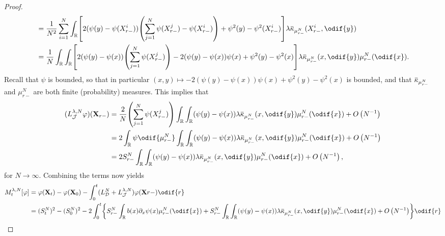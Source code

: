\begin{proof}
\begin{equation}
\begin{split}
       & = \frac{1}{N^2} \sum_{i=1}^N \int_\potspace \sbr*{ 2 (\psi(y) - \psi(X_{r-}^i)) \br*{\sum_{j=1}^N \psi(X_{r-}^j) - \psi(X_{r-}^i)} + \psi^2(y) - \psi^2(X_{r-}^i) } \lambda \ol{\kappa}_{\mu_{r-}^N}(X_{r-}^i, \odif{y})                               \\
       & = \frac{1}{N} \int_\potspace \int_\potspace \sbr*{ 2 (\psi(y) - \psi(x)) \br*{\sum_{j=1}^N \psi(X_{r-}^j)} - 2 (\psi(y) - \psi(x)) \psi(x) + \psi^2(y) - \psi^2(x) } \lambda \ol{\kappa}_{\mu_{r-}^N}(x, \odif{y}) \mu_{r-}^N(\odif{x}).
    \end{split}
  \end{equation}
  Recall that \( \psi \) is bounded, so that in particular \( (x,y) \mapsto - 2 (\psi(y) - \psi(x)) \psi(x) + \psi^2(y) - \psi^2(x) \) is bounded, and that \( \ol{\kappa}_{\mu_{r-}^N} \) and \( \mu_{r-}^N \) are both finite (probability) measures.
  This implies that
  \begin{equation}
    \begin{split}
      (L_{\cJ}^{\lambda, N} \varphi) (\bm{X}_{r-})
       & = \frac{2}{N} \br*{\sum_{j=1}^N \psi(X_{r-}^j)}  \int_\potspace \int_\potspace (\psi(y) - \psi(x)) \lambda \ol{\kappa}_{\mu_{r-}^N}(x, \odif{y}) \mu_{r-}^N(\odif{x}) + \bigO{N^{-1}} \\
       & = 2 \int_\potspace \psi \odif{\mu_{r-}^N} \int_\potspace \int_\potspace (\psi(y) - \psi(x)) \lambda \ol{\kappa}_{\mu_{r-}^N}(x, \odif{y}) \mu_{r-}^N(\odif{x})  + \bigO{N^{-1}}       \\
       & = 2 S_{r-}^N \int_\potspace \int_\potspace (\psi(y) - \psi(x)) \lambda \ol{\kappa}_{\mu_{r-}^N}(x, \odif{y}) \mu_{r-}^N(\odif{x})  + \bigO{N^{-1}},
    \end{split}
  \end{equation}
  for \( N \to \infty \).
  Combining the terms now yields
  \begin{equation}
    \begin{split}
      M_t^{\lambda, N}[\varphi]
                                         & = \varphi(\bm{X}_t) - \varphi(\bm{X}_0) - \int_0^t (L_{\cD}^{N} + L_{\cJ}^{\lambda, N}) \varphi (\bm{X}{r-}) \odif{r}                                                                                                                                             \\
                                         & = (S_t^N)^2 - (S_0^N)^2 - 2 \int_0^t \cbr*{ S_{r-}^N \int_\potspace b(x) \partial_x \psi (x) \mu_{r-}^N(\odif{x}) + S_{r-}^N \int_\potspace \int_\potspace (\psi(y) - \psi(x)) \lambda \ol{\kappa}_{\mu_{r-}^N}(x, \odif{y}) \mu_{r-}^N(\odif{x})  + \bigO{N^{-1}} }  \odif{r} \\

\end{split}
\end{equation}
\end{proof}
